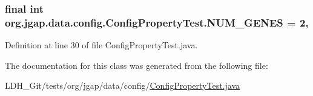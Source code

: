 \hypertarget{classorg_1_1jgap_1_1data_1_1config_1_1_config_property_test_a7cdbf0ca3237bc51342a7bc655d08dd0}{
\subsubsection[{N\-U\-M\-\_\-\-G\-E\-N\-E\-S}]{\setlength{\rightskip}{0pt plus 5cm}final int org.\-jgap.\-data.\-config.\-Config\-Property\-Test.\-N\-U\-M\-\_\-\-G\-E\-N\-E\-S = 2\hspace{0.3cm}{\ttfamily [static]}, {\ttfamily [private]}}}\label{classorg_1_1jgap_1_1data_1_1config_1_1_config_property_test_a7cdbf0ca3237bc51342a7bc655d08dd0}


Definition at line 30 of file Config\-Property\-Test.\-java.



The documentation for this class was generated from the following file\-:\begin{DoxyCompactItemize}
\item 
L\-D\-H\-\_\-\-Git/tests/org/jgap/data/config/\hyperlink{_config_property_test_8java}{Config\-Property\-Test.\-java}\end{DoxyCompactItemize}

